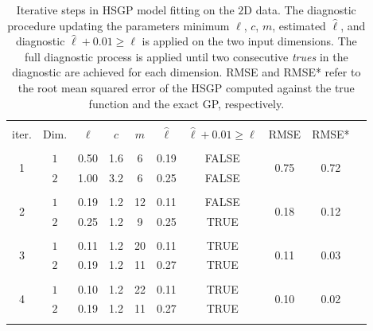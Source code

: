 
\begin{table}
\centering
\setlength{\tabcolsep}{3.6pt}
\begin{tabular}{cccccccccc}
\arrayrulecolor{gray}\hline \\[-3mm]
 iter. & Dim. & $\ell$ & $c$ & $m$ & $\hat{\ell}$ & $\hat{\ell} + 0.01 \geq \ell$ & RMSE & RMSE* \\ 
\arrayrulecolor{lightgray}\hline \\[-2mm]
 \multirow{2}{*}{ 1 } & $1$ & 0.50 & 1.6 & 6 & 0.19 & FALSE & \multirow{2}{*}{ 0.75 } & \multirow{2}{*}{ 0.72 }\\ 
 & $2$ & 1.00 & 3.2 & 6 & 0.25 & FALSE &  &  \\
\arrayrulecolor{lightgray}\hline \\[-2mm]
 \multirow{2}{*}{ 2 } & $1$ & 0.19 & 1.2 & 12 & 0.11 & FALSE  & \multirow{2}{*}{ 0.18 } & \multirow{2}{*}{ 0.12 }\\
 & $2$ & 0.25 & 1.2 & 9 & 0.25 & TRUE &  &  \\
\arrayrulecolor{lightgray}\hline \\[-2mm]
 \multirow{2}{*}{ 3 } & $1$ & 0.11 & 1.2 & 20 & 0.11 & TRUE  & \multirow{2}{*}{ 0.11 } & \multirow{2}{*}{ 0.03 }\\
 & $2$ & 0.19 & 1.2 & 11 & 0.27 & TRUE &  &  \\
\arrayrulecolor{lightgray}\hline \\[-2mm]
 \multirow{2}{*}{ 4 } & $1$ & 0.10 & 1.2 & 22 & 0.11 & TRUE  & \multirow{2}{*}{ 0.10 } & \multirow{2}{*}{ 0.02 }\\
 & $2$ & 0.19 & 1.2 & 11 & 0.27 & TRUE  &  & \\[1mm] 
\arrayrulecolor{lightgray}\hline
 \multicolumn{8}{l}{{\small Exact GP length-scales:} $\ell_{1_{GP}}=0.10$, \, $\ell_{2_{GP}}=0.29$ }
\end{tabular}
\caption{Iterative steps in HSGP model fitting on the $2$D data. The diagnostic procedure updating the parameters minimum $\ell$, $c$, $m$, estimated $\hat{\ell}$, and diagnostic $\hat{\ell} + 0.01 \geq \ell$ is applied on the two input dimensions. The full diagnostic process is applied until two consecutive \textit{trues} in the diagnostic are achieved for each dimension. RMSE and RMSE* refer to the root mean squared error of the HSGP computed against the true function and the exact GP, respectively.}
  \label{tab_caseIII_2D}
\end{table}

